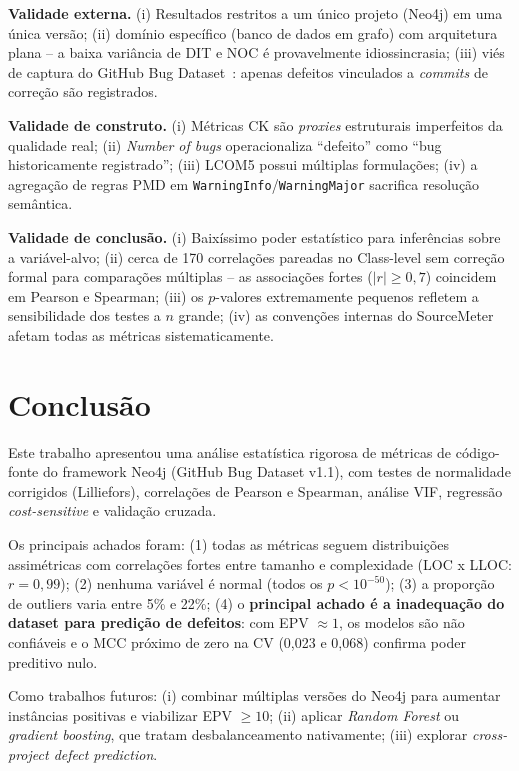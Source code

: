 \documentclass[conference]{IEEEtran}
\begin{document}
\textbf{Validade externa.} (i) Resultados restritos a um único projeto (Neo4j) em uma única versão; (ii) domínio específico (banco de dados em grafo) com arquitetura plana -- a baixa variância de DIT e NOC é provavelmente idiossincrasia; (iii) viés de captura do GitHub Bug Dataset~\cite{toth2016}: apenas defeitos vinculados a \textit{commits} de correção são registrados.

\textbf{Validade de construto.} (i) Métricas CK são \textit{proxies} estruturais imperfeitos da qualidade real; (ii) \textit{Number of bugs} operacionaliza ``defeito'' como ``bug historicamente registrado''; (iii) LCOM5 possui múltiplas formulações; (iv) a agregação de regras PMD em \texttt{WarningInfo}/\texttt{WarningMajor} sacrifica resolução semântica.

\textbf{Validade de conclusão.} (i) Baixíssimo poder estatístico para inferências sobre a variável-alvo; (ii) cerca de 170 correlações pareadas no Class-level sem correção formal para comparações múltiplas -- as associações fortes ($|r| \geq 0{,}7$) coincidem em Pearson e Spearman; (iii) os $p$-valores extremamente pequenos refletem a sensibilidade dos testes a $n$ grande; (iv) as convenções internas do SourceMeter afetam todas as métricas sistematicamente.

\section{Conclusão}\label{sec:conclusao}

Este trabalho apresentou uma análise estatística rigorosa de métricas de código-fonte do framework Neo4j (GitHub Bug Dataset v1.1), com testes de normalidade corrigidos (Lilliefors), correlações de Pearson e Spearman, análise VIF, regressão \textit{cost-sensitive} e validação cruzada.

Os principais achados foram: (1) todas as métricas seguem distribuições assimétricas com correlações fortes entre tamanho e complexidade (LOC x LLOC: $r = 0{,}99$); (2) nenhuma variável é normal (todos os $p < 10^{-50}$); (3) a proporção de outliers varia entre 5\% e 22\%; (4) o \textbf{principal achado é a inadequação do dataset para predição de defeitos}: com EPV $\approx 1$, os modelos são não confiáveis e o MCC próximo de zero na CV (0,023 e 0,068) confirma poder preditivo nulo.

Como trabalhos futuros: (i) combinar múltiplas versões do Neo4j para aumentar instâncias positivas e viabilizar EPV $\geq 10$; (ii) aplicar \textit{Random Forest} ou \textit{gradient boosting}, que tratam desbalanceamento nativamente; (iii) explorar \textit{cross-project defect prediction}.
\end{document}
